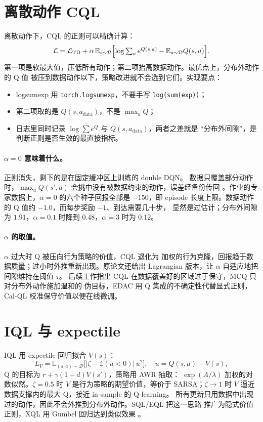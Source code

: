 \documentclass[10pt,twocolumn,a4paper]{ctexart}
\begin{document}
\section{离散动作 CQL}
离散动作下，CQL 的正则可以精确计算\citep{kumar2020cql}：
\begin{equation}
\mathcal{L}=\mathcal{L}_{\mathrm{TD}}+\alpha\,\mathbb{E}_{s\sim\mathcal{D}}\Bigl[
\log\textstyle\sum_a e^{Q(s,a)}-\mathbb{E}_{a\sim\mathcal{D}}Q(s,a)\Bigr].
\end{equation}
第一项是软最大值，压低所有动作；第二项抬高数据动作。最优点上，分布外动作的 Q 值
被压到数据动作以下，策略改进就不会选到它们。实现要点：
\begin{itemize}
\item logsumexp 用 \texttt{torch.logsumexp}，不要手写 \texttt{log(sum(exp))}；
\item 第二项取的是 $Q(s,a_{\text{data}})$，不是 $\max_a Q$；
\item 日志里同时记录 $\log\sum e^{Q}$ 与 $Q(s,a_{\text{data}})$，两者之差就是
“分布外间隙”，是判断正则是否生效的最直接指标。
\end{itemize}

\paragraph{$\alpha=0$ 意味着什么。}正则消失，剩下的是在固定缓冲区上训练的 double DQN。
数据只覆盖部分动作时，$\max_a Q(s',a)$ 会挑中没有被数据约束的动作，误差经备份传回
\citep{fujimoto2019bcq,kumar2019bear}。作业的专家数据上，$\alpha=0$ 的六个种子回报全部是
$-150$，即 episode 长度上限。数据动作的 Q 值约 $-1.0$，而每步奖励 $-1$、到达需要几十步，
显然是过估计；分布外间隙为 $1.91$，$\alpha=0.1$ 时降到 $0.48$，$\alpha=3$ 时为 $0.12$。

\paragraph{$\alpha$ 的取值。}$\alpha$ 过大时 Q 被压向行为策略的价值，CQL 退化为
加权的行为克隆，回报趋于数据质量；过小时外推重新出现。原论文还给出
Lagrangian 版本，让 $\alpha$ 自适应地把间隙维持在阈值 $\tau$\citep{kumar2020cql}。
后续工作指出 CQL 在数据覆盖好的区域过于保守，MCQ 只对分布外动作施加温和的
伪目标\citep{lyu2022mcq}，EDAC 用 Q 集成的不确定性代替显式正则\citep{an2021edac}，
Cal-QL 校准保守价值以便在线微调\citep{nakamoto2023calql}。

\section{IQL 与 expectile}
IQL 用 expectile 回归拟合 $V(s)$\citep{kostrikov2022iql,newey1987expectile}：
\begin{equation}
L_V=\mathbb{E}_{(s,a)\sim\mathcal{D}}\bigl[|\zeta-\mathbb{1}(u<0)|\,u^2\bigr],
\quad u=Q(s,a)-V(s),
\end{equation}
Q 的目标为 $r+\gamma(1-d)V(s')$，策略用 AWR 抽取\citep{peng2019awr,nair2020awac}：
$\exp(A/\lambda)$ 加权的对数似然。$\zeta=0.5$ 时 $V$ 是行为策略的期望价值，等价于
SARSA；$\zeta\to1$ 时 $V$ 逼近数据支撑内的最大 Q，接近 in-sample 的 Q-learning。
所有更新只用数据中出现过的动作，因此不会外推到分布外动作。SQL/EQL 把这一思路
推广为隐式价值正则\citep{xu2023sql}，XQL 用 Gumbel 回归达到类似效果
\citep{garg2023xql}。
\end{document}
